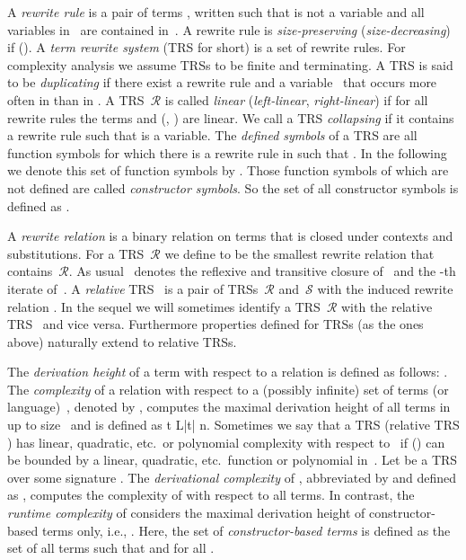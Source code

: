 \documentclass{LMCS}
\theoremstyle{plain}\newtheorem{mainthm}[thm]{Main Theorem}
\newcommand\TRS[1]{\ensuremath{\mathcal{#1}}}
\begin{document}
A \emph{rewrite rule} is a pair of terms , written  such
that  is not a variable and all variables in~ are contained in~.
A rewrite rule  is \emph{size-preserving} (\emph{size-decreasing})
if  ().
A \emph{term rewrite system} (TRS for short) is a set of rewrite rules.
For complexity analysis we assume TRSs to be finite and terminating.
A TRS  is said to be \emph{duplicating} if there exist a rewrite
rule  and a variable~ that occurs more often in 
than in . 
A TRS~\TRS{R} is called \emph{linear} (\emph{left-linear}, \emph{right-linear})
if for all rewrite rules  the terms  and  (, )
are linear.
We call a TRS  \emph{collapsing} if it
contains a rewrite rule  such that  is a variable. The
\emph{defined symbols} of a TRS  are all function symbols
 for which there is a rewrite rule  in  such that
. In the following we denote this set of function symbols
by . Those function symbols of  which are not
defined are called \emph{constructor symbols}. So the set of all constructor
symbols is defined as .

A \emph{rewrite relation} is a binary relation on terms that is
closed under contexts and substitutions. For a TRS~\TRS{R} we define
 to be the smallest rewrite relation that contains~\TRS{R}.
As usual~ denotes the reflexive and transitive closure of~
and  the -th iterate of~.
A \emph{relative} TRS~ is a pair of TRSs~\TRS{R}
and~\TRS{S} with the induced rewrite relation
. In the
sequel we will sometimes identify a TRS~\TRS{R} with the relative
TRS~ and vice versa.
Furthermore properties defined for TRSs (as the ones above) naturally
extend to relative TRSs.

The \emph{derivation height} of a term  with respect to a relation 
is defined as follows: .
The \emph{complexity} of a relation  with respect to a (possibly infinite)
set of terms (or language)~, denoted by , computes the
maximal derivation height of all terms in~ up to size~ and is defined as
t \in L|t| \leqslant n.
Sometimes we say that a TRS  (relative TRS )
has linear, quadratic, etc.\ or polynomial complexity with respect to~ if
 () can be
bounded by a linear, quadratic, etc.\ function or polynomial in~.
Let  be a TRS over some signature . The
\emph{derivational complexity} of , abbreviated by
 and defined as
,
computes the complexity of  with respect to all
terms. In contrast, the \emph{runtime complexity} of 
considers the maximal derivation height of constructor-based terms only,
i.e., .
Here, the set of \emph{constructor-based terms} 
is defined as the set of all terms  such that
 and 
for all .
\end{document}
